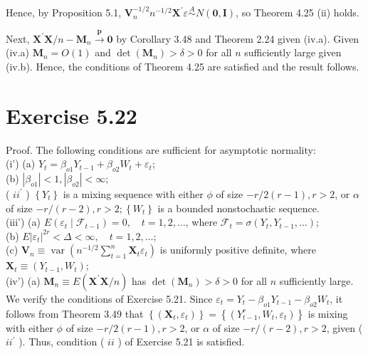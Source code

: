 \documentclass[10pt]{article}
\begin{document}
Hence, by Proposition 5.1, $\mathbf{V}_{n}^{-1 / 2} n^{-1 / 2} \mathbf{X}^{\prime} \varepsilon \stackrel{A}{\sim} N(\mathbf{0}, \mathbf{I})$, so Theorem 4.25 (ii) holds.

Next, $\mathbf{X}^{\prime} \mathbf{X} / n-\mathbf{M}_{n} \xrightarrow{\boldsymbol{p}} \mathbf{0}$ by Corollary 3.48 and Theorem 2.24 given (iv.a). Given (iv.a) $\mathbf{M}_{n}=O(1)$ and $\operatorname{det}\left(\mathbf{M}_{n}\right)>\delta>0$ for all $n$ sufficiently large given (iv.b). Hence, the conditions of Theorem 4.25 are satisfied and the result follows.

\section*{Exercise 5.22}
Proof. The following conditions are sufficient for asymptotic normality:\\
(i') (a) $Y_{t}=\beta_{o 1} Y_{t-1}+\beta_{o 2} W_{t}+\varepsilon_{t}$;\\
(b) $\left|\beta_{o 1}\right|<1,\left|\beta_{o 2}\right|<\infty$;\\
( $i i^{\prime}$ ) $\left\{Y_{t}\right\}$ is a mixing sequence with either $\phi$ of size $-r / 2(r-1), r>2$, or $\alpha$ of size $-r /(r-2), r>2 ;\left\{W_{t}\right\}$ is a bounded nonstochastic sequence.\\
(iii') (a) $E\left(\varepsilon_{t} \mid \mathcal{F}_{t-1}\right)=0, \quad t=1,2, \ldots$, where $\mathcal{F}_{t}=\sigma\left(Y_{t}, Y_{t-1}, \ldots\right)$;\\
(b) $E\left|\varepsilon_{t}\right|^{2 r}<\Delta<\infty, \quad t=1,2, \ldots$;\\
(c) $\mathbf{V}_{n} \equiv \operatorname{var}\left(n^{-1 / 2} \sum_{t=1}^{n} \mathbf{X}_{t} \varepsilon_{t}\right)$ is uniformly positive definite, where $\mathbf{X}_{t} \equiv\left(Y_{t-1}, W_{t}\right) ;$\\
(iv') (a) $\mathbf{M}_{n} \equiv E\left(\mathbf{X}^{\prime} \mathbf{X} / n\right)$ has $\operatorname{det}\left(\mathbf{M}_{n}\right)>\delta>0$ for all $n$ sufficiently large.\\
We verify the conditions of Exercise 5.21. Since $\varepsilon_{t}=Y_{t}-\beta_{o 1} Y_{t-1}-\beta_{o 2} W_{t}$, it follows from Theorem 3.49 that $\left\{\left(\mathbf{X}_{t}, \varepsilon_{t}\right)\right\}=\left\{\left(Y_{t-1}^{r}, W_{t}, \varepsilon_{t}\right)\right\}$ is mixing with either $\phi$ of size $-r / 2(r-1), r>2$, or $\alpha$ of size $-r /(r-2), r>2$, given ( $i i^{\prime}$ ). Thus, condition ( $i i$ ) of Exercise 5.21 is satisfied.
\end{document}
